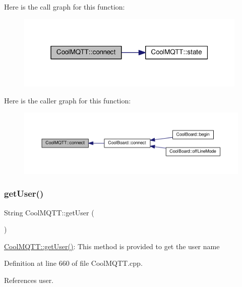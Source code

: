 Here is the call graph for this function\+:\nopagebreak
\begin{figure}[H]
\begin{center}
\leavevmode
\includegraphics[width=313pt]{classCoolMQTT_a50075d0ab23a327ab897fd6adad20eda_cgraph}
\end{center}
\end{figure}
Here is the caller graph for this function\+:
\nopagebreak
\begin{figure}[H]
\begin{center}
\leavevmode
\includegraphics[width=350pt]{classCoolMQTT_a50075d0ab23a327ab897fd6adad20eda_icgraph}
\end{center}
\end{figure}
\mbox{\label{classCoolMQTT_a373cc92fca7760d886f02d8a6e5b3f63}} 
\subsubsection{\texorpdfstring{get\+User()}{getUser()}}
{\footnotesize\ttfamily String Cool\+M\+Q\+T\+T\+::get\+User (\begin{DoxyParamCaption}{ }\end{DoxyParamCaption})}

\hyperlink{classCoolMQTT_a373cc92fca7760d886f02d8a6e5b3f63}{Cool\+M\+Q\+T\+T\+::get\+User()}\+: This method is provided to get the user name 

Definition at line 660 of file Cool\+M\+Q\+T\+T.\+cpp.



References user.



